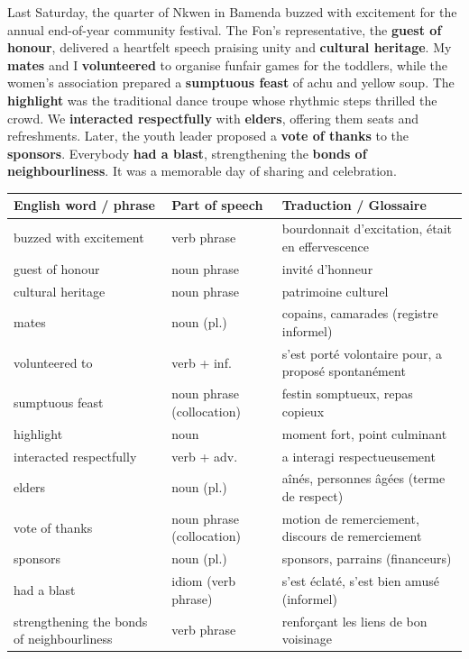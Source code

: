 \documentclass[11pt]{article}
\begin{document}
\begin{textebox}
Last Saturday, the quarter of Nkwen in Bamenda buzzed with excitement for the annual end-of-year community festival. The Fon’s representative, the \textbf{guest of honour}, delivered a heartfelt speech praising unity and \textbf{cultural heritage}. My \textbf{mates} and I \textbf{volunteered} to organise funfair games for the toddlers, while the women’s association prepared a \textbf{sumptuous feast} of achu and yellow soup. The \textbf{highlight} was the traditional dance troupe whose rhythmic steps thrilled the crowd. We \textbf{interacted respectfully} with \textbf{elders}, offering them seats and refreshments. Later, the youth leader proposed a \textbf{vote of thanks} to the \textbf{sponsors}. Everybody \textbf{had a blast}, strengthening the \textbf{bonds of neighbourliness}. It was a memorable day of sharing and celebration.
\end{textebox}

\begin{center}
\begin{tabularx}{\linewidth}{|l|X|X|}\hline
\rowcolor{popblueL} \textbf{English word / phrase} & \textbf{Part of speech} & \textbf{Traduction / Glossaire} \\ \hline
buzzed with excitement & verb phrase & bourdonnait d'excitation, était en effervescence \\ \hline
guest of honour & noun phrase & invité d'honneur \\ \hline
cultural heritage & noun phrase & patrimoine culturel \\ \hline
mates & noun (pl.) & copains, camarades (registre informel) \\ \hline
volunteered to & verb + inf. & s'est porté volontaire pour, a proposé spontanément \\ \hline
sumptuous feast & noun phrase (collocation) & festin somptueux, repas copieux \\ \hline
highlight & noun & moment fort, point culminant \\ \hline
interacted respectfully & verb + adv. & a interagi respectueusement \\ \hline
elders & noun (pl.) & aînés, personnes âgées (terme de respect) \\ \hline
vote of thanks & noun phrase (collocation) & motion de remerciement, discours de remerciement \\ \hline
sponsors & noun (pl.) & sponsors, parrains (financeurs) \\ \hline
had a blast & idiom (verb phrase) & s'est éclaté, s'est bien amusé (informel) \\ \hline
strengthening the bonds of neighbourliness & verb phrase & renforçant les liens de bon voisinage \\ \hline
\end{tabularx}
\end{center}
\end{document}
